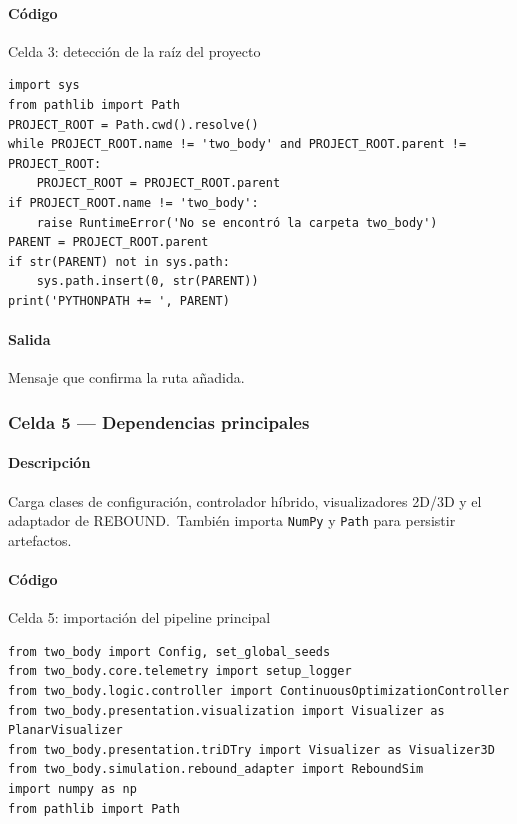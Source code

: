 \paragraph{Código}
\begin{listing}[H]
\caption{Celda 3: detección de la raíz del proyecto}
\label{lst:c04_cell03}
\begin{adjustbox}{max width=\textwidth}
\begin{minipage}{\textwidth}
\begin{verbatim}
import sys
from pathlib import Path
PROJECT_ROOT = Path.cwd().resolve()
while PROJECT_ROOT.name != 'two_body' and PROJECT_ROOT.parent != PROJECT_ROOT:
    PROJECT_ROOT = PROJECT_ROOT.parent
if PROJECT_ROOT.name != 'two_body':
    raise RuntimeError('No se encontró la carpeta two_body')
PARENT = PROJECT_ROOT.parent
if str(PARENT) not in sys.path:
    sys.path.insert(0, str(PARENT))
print('PYTHONPATH += ', PARENT)
\end{verbatim}
\end{minipage}
\end{adjustbox}
\end{listing}
\paragraph{Salida} Mensaje que confirma la ruta añadida.

\subsubsection*{Celda 5 — Dependencias principales}
\paragraph{Descripción} Carga clases de configuración, controlador híbrido, visualizadores 2D/3D y el adaptador de REBOUND.\ También importa \texttt{NumPy} y \texttt{Path} para persistir artefactos.
\paragraph{Código}
\begin{listing}[H]
\caption{Celda 5: importación del pipeline principal}
\label{lst:c04_cell05}
\begin{adjustbox}{max width=\textwidth}
\begin{minipage}{\textwidth}
\begin{verbatim}
from two_body import Config, set_global_seeds
from two_body.core.telemetry import setup_logger
from two_body.logic.controller import ContinuousOptimizationController
from two_body.presentation.visualization import Visualizer as PlanarVisualizer
from two_body.presentation.triDTry import Visualizer as Visualizer3D
from two_body.simulation.rebound_adapter import ReboundSim
import numpy as np
from pathlib import Path
\end{verbatim}
\end{minipage}
\end{adjustbox}
\end{listing}
